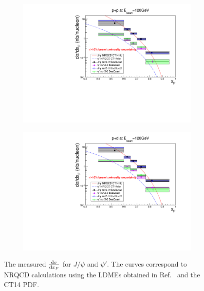\documentclass[reprint,aps,unsortedaddress,superscriptaddress,prd,floatfix,showpacs,linenumbers]{revtex4-2}
\begin{document}
\begin{figure}
	\begin{subfigure}{0.45\linewidth}
		\includegraphics[width=\linewidth]{figures/crossSections/xF/combine_xF_LH2_5-6_5770_psip}
	\end{subfigure}
	\begin{subfigure}{0.45\linewidth}
		\includegraphics[width=\linewidth]{figures/crossSections/xF/combine_xF_LD2_5-6_5770_psip}
	\end{subfigure}
	\caption{The measured $\dv{\sigma}{x_F}$ for $J/\psi$ and $\psi'$. The curves correspond to NRQCD
		calculations using the LDMEs obtained in Ref.~\cite{hsieh2021} and the CT14 PDF.}
	\label{fig:xF_cross_sections}
\end{figure}
\end{document}
